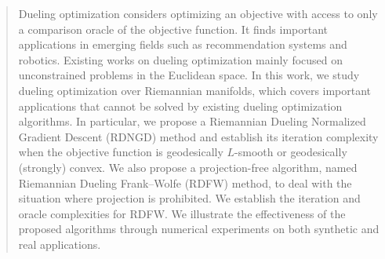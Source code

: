 \documentclass{article}
\theoremstyle{plain}
\theoremstyle{definition}
\theoremstyle{remark}
\begin{document}


\printAffiliationsAndNotice{} 


\begin{abstract}
Dueling optimization considers optimizing an objective with access to only a comparison oracle of the objective function. It finds important applications in emerging fields such as recommendation systems and robotics. Existing works on dueling optimization mainly focused on unconstrained problems in the Euclidean space. In this work, we study dueling optimization over Riemannian manifolds, which covers important applications that cannot be solved by existing dueling optimization algorithms. In particular, we propose a Riemannian Dueling Normalized Gradient Descent (RDNGD) method and establish its iteration complexity when the objective function is geodesically $L$-smooth or geodesically (strongly) convex. We also propose a projection-free algorithm, named Riemannian Dueling Frank–Wolfe (RDFW) method, to deal with the situation where projection is prohibited. We establish the iteration and oracle complexities for RDFW. We illustrate the effectiveness of the proposed algorithms through numerical experiments on both synthetic and real applications. 
\end{abstract}
\end{document}
